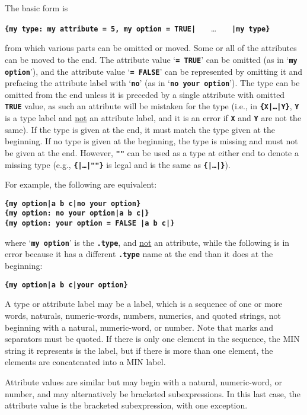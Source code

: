 \documentclass[12pt]{article}
\newcommand{\TT}[1]{{\tt \bfseries #1}}
\begin{document}
The basic form is
\begin{center}
\TT{\{my type: my attribute = 5, my option = TRUE|} ~~~\ldots~~~
    \TT{|my type\}} \\
\end{center}
from which various parts can be omitted or moved.  Some or all of the
attributes can be moved to the end.
The attribute value `\TT{= TRUE}' can be omitted (as in
`\TT{my option}'), and the attribute value `\TT{= FALSE}' can be represented
by omitting it and prefacing the attribute label with `\TT{no}'
(as in `\TT{no your option}').
The type can be omitted from the end unless it is preceded
by a single attribute with omitted \TT{TRUE} value, as such an attribute
will be mistaken for the type
(i.e., in \TT{\{X|\ldots|Y\}}, \TT{Y} is
a type label and \underline{not} an attribute label, and it is an error
if \TT{X} and \TT{Y} are not the same).
If the type is given at the end, it must match the type given at the
beginning.  If no type is given at the beginning, the type is missing
and must not be given at the end.  However, \TT{""} can be used as a type
at either end to denote a missing type (e.g., \TT{\{|\ldots|""\}} is
legal and is the same as \TT{\{|\ldots|\}}).

For example, the following are equivalent:
\begin{center}
\TT{\{my option|a b c|no your option\}} \\
\TT{\{my option:~no your option|a b c|\}} \\
\TT{\{my option:~your option = FALSE |a b c|\}}
\end{center}

where `\TT{my option}' is the \TT{.type}, and \underline{not}
an attribute,
while the following is in error because it has a different \TT{.type} name
at the end than it does at the beginning:
\begin{center}
\TT{\{my option|a b c|your option\}} \\
\end{center}

A type or attribute label may be a label,
which is a sequence
of one or more words, naturals, numeric-words, numbers,
numerics, and quoted strings,
not beginning with a natural, numeric-word, or number.
Note that marks and separators must be quoted.
If there is only
one element in the sequence, the MIN string it represents is the
label, but if there is more than one element, the elements
are concatenated into a MIN label.

Attribute values are similar but may begin with a natural, numeric-word,
or number, and may alternatively be bracketed subexpressions.
In this last case, the attribute value is the bracketed subexpression,
with one exception.
\end{document}
